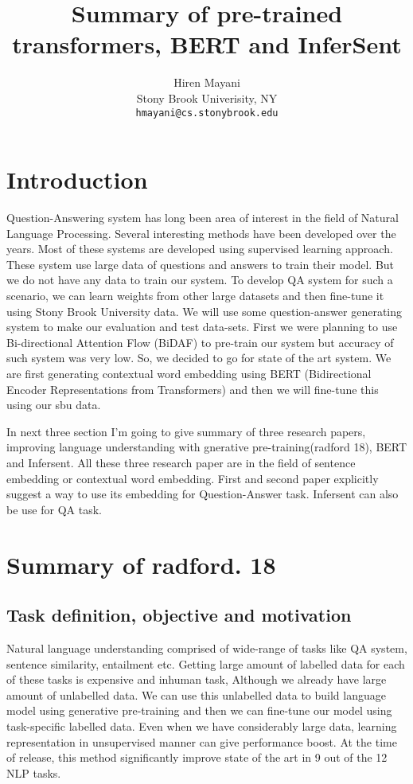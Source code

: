 \documentclass[11pt,a4paper]{article}
\title{Summary of pre-trained transformers, BERT and InferSent}
\author{Hiren Mayani \\
  Stony Brook Univerisity, NY \\
  {\tt hmayani@cs.stonybrook.edu} \\}
\date{}
\begin{document}
\maketitle

\section{Introduction}
  Question-Answering system has long been area of interest in the field of Natural Language Processing. Several interesting methods have been developed over the years. Most of these systems are developed using supervised learning approach. These system use large data of questions and answers to train their model. But we do not have any data to train our system. To develop QA system for such a scenario, we can learn weights from other large datasets and then fine-tune it using Stony Brook University data. We will use some question-answer generating system to make our evaluation and test data-sets. First we were planning to use Bi-directional Attention Flow (BiDAF) to pre-train our system but accuracy of such system was  very low. So, we decided to go for state of the art system. We are first generating contextual word embedding using BERT (Bidirectional Encoder Representations from Transformers) and then we will fine-tune this using our sbu data. 
  
  
In next three section I'm going to give summary of three research papers, improving language understanding with gnerative pre-training(radford 18), BERT and Infersent. All these three research paper are in the field of sentence embedding or contextual word embedding. First and second paper explicitly suggest a way to use its embedding for Question-Answer task. Infersent can also be use for QA task.

\iffalse
An introduction to the problem space of your project. What is the high-level IO, why is this important, why is this problem hard, and what broad type of techniques have been explored in this space. 
\fi
\section{Summary of radford. 18}

\subsection{Task definition, objective and  motivation}
Natural language understanding comprised of wide-range of tasks like QA system, sentence similarity, entailment etc. Getting large amount of labelled data for each of these tasks is expensive and inhuman task, Although we already have large amount of unlabelled data. We can use this unlabelled data to build language model using generative pre-training and then we can fine-tune our model using task-specific labelled data. Even when we have considerably large data, learning representation in unsupervised manner can give performance boost. At the time of release, this method significantly improve state of the art in 9 out of the 12 NLP tasks. 
\end{document}
